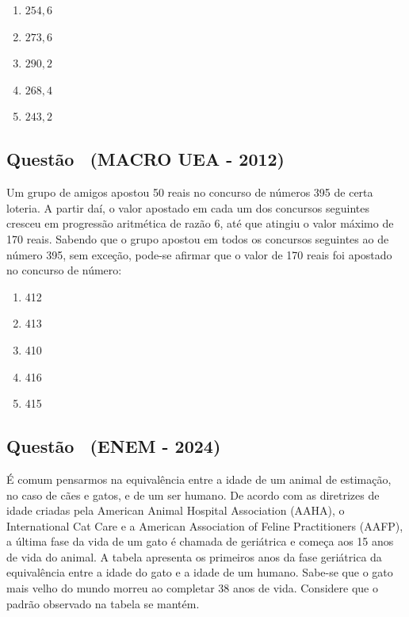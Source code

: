 \documentclass[12pt]{article}
\newcounter{questao}
\newcommand{\novaquestao}[1]{%
  \stepcounter{questao}%
  \subsection*{Questão \thequestao\ (#1)}%
}
\begin{document}
\begin{multicols}{2}
            \begin{enumerate}[label=(\alph*), noitemsep]
                \item $254,6$
                \item $273,6$
                \item $290,2$
                \item $268,4$
                \item $243,2$
            \end{enumerate}

        \novaquestao{MACRO UEA - 2012}
            Um grupo de amigos apostou 50 reais no concurso de números 395 de certa loteria. A partir daí, o valor apostado em cada um dos concursos seguintes cresceu em progressão aritmética de razão 6, até que atingiu o valor máximo de 170 reais. Sabendo que o grupo apostou em todos os concursos seguintes ao de número 395, sem exceção, pode-se afirmar que o valor de 170 reais foi apostado no concurso de número:

            \begin{enumerate}[label=(\alph*), noitemsep]
                \item 412
                \item 413
                \item 410
                \item 416
                \item 415
            \end{enumerate}

        \novaquestao{ENEM - 2024}
            É comum pensarmos na equivalência entre a idade de um animal de estimação, no caso de cães e gatos, e de um ser humano. De acordo com as diretrizes de idade criadas pela American Animal Hospital Association (AAHA), o International Cat Care e a American Association of Feline Practitioners (AAFP), a última fase da vida de um gato é chamada de geriátrica e começa aos 15 anos de vida do animal. A tabela apresenta os primeiros anos da fase geriátrica da equivalência entre a idade do gato e a idade de um humano. Sabe-se que o gato mais velho do mundo morreu ao completar 38 anos de vida. Considere que o padrão observado na tabela se mantém.
            

\end{multicols}
\end{document}
